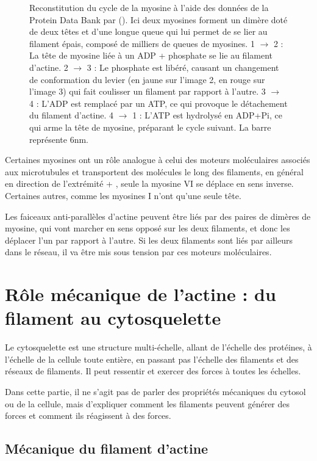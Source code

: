 \begin{figure}
\caption{Reconstitution du cycle de la myosine à l'aide des données de la Protein Data Bank par (\cite{vale_way_2000}). Ici deux myosines forment un dimère doté de deux têtes et d'une longue queue qui lui permet de se lier au filament épais, composé de milliers de queues de myosines.  1 $\rightarrow$ 2 : La tête de myosine liée à un ADP + phosphate se lie au filament d'actine. 2 $\rightarrow$ 3 : Le phosphate est libéré, causant un changement de conformation du levier (en jaune sur l'image 2, en rouge sur l'image 3) qui fait coulisser un filament par rapport à l'autre. 3 $\rightarrow$ 4 : L'ADP est remplacé par un ATP, ce qui provoque le détachement du filament d'actine. 4 $\rightarrow$ 1 : L'ATP est hydrolysé en ADP+Pi, ce qui arme la tête de myosine, préparant le cycle suivant. La barre représente 6nm. \label{myosin_cycle}}
\end{figure} 



Certaines myosines ont un rôle analogue à celui des moteurs moléculaires associés aux microtubules et transportent des molécules le long des filaments, en général en direction de l'extrémité + , seule la myosine VI se déplace en sens inverse. Certaines autres, comme les myosines I n'ont qu'une seule tête. 


Les faiceaux anti-parallèles d'actine peuvent être liés par des paires de dimères de myosine, qui vont marcher en sens opposé sur les deux filaments, et donc les déplacer l'un par rapport à l'autre. Si les deux filaments sont liés par ailleurs dans le réseau, il va être mis sous tension par ces moteurs moléculaires. 




\section{Rôle mécanique de l'actine : du filament au cytosquelette}

Le cytosquelette est une structure multi-échelle, allant de l'échelle des protéines, à l'échelle de la cellule toute entière, en passant pas l'échelle des filaments et des réseaux de filaments. Il peut ressentir et exercer des forces à toutes les échelles. 


Dans cette partie, il ne s'agit pas de parler des propriétés mécaniques du cytosol ou de la cellule, mais d'expliquer comment les filaments peuvent générer des forces et comment ils réagissent à des forces. 

\subsection{Mécanique du filament d'actine}


